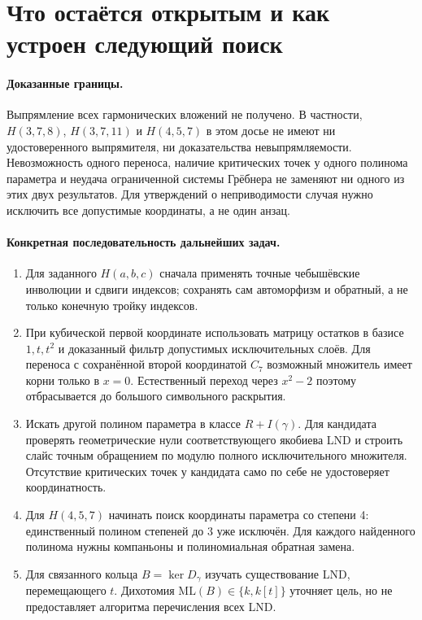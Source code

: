 \section{Что остаётся открытым и как устроен следующий поиск}

\paragraph{Доказанные границы.}
Выпрямление всех гармонических вложений не получено. В частности,
$H(3,7,8)$, $H(3,7,11)$ и $H(4,5,7)$ в этом досье не имеют
ни удостоверенного выпрямителя, ни доказательства невыпрямляемости.
Невозможность одного переноса, наличие критических точек у одного
полинома параметра и неудача ограниченной системы Грёбнера не заменяют
ни одного из этих двух результатов. Для утверждений о неприводимости
случая нужно исключить все допустимые координаты, а не один анзац.

\paragraph{Конкретная последовательность дальнейших задач.}
\begin{enumerate}
\item Для заданного $H(a,b,c)$ сначала применять точные чебышёвские
инволюции и сдвиги индексов; сохранять сам автоморфизм и обратный,
а не только конечную тройку индексов.
\item При кубической первой координате использовать матрицу остатков
в базисе $1,t,t^2$ и доказанный фильтр допустимых исключительных слоёв.
Для переноса с сохранённой второй координатой $C_7$ возможный
множитель имеет корни только в $x=0$. Естественный переход через
$x^2-2$ поэтому отбрасывается до большого символьного раскрытия.
\item Искать другой полином параметра в классе $R+I(\gamma)$.
Для кандидата проверять геометрические нули соответствующего
якобиева LND и строить слайс точным обращением по модулю полного
исключительного множителя. Отсутствие критических точек у кандидата
само по себе не удостоверяет координатность.
\item Для $H(4,5,7)$ начинать поиск координаты параметра со степени 4:
единственный полином степеней до 3 уже исключён. Для каждого найденного
полинома нужны компаньоны и полиномиальная обратная замена.
\item Для связанного кольца $B=\ker D_\gamma$ изучать существование
LND, перемещающего $t$. Дихотомия $\mathrm{ML}(B)\in\{k,k[t]\}$
уточняет цель, но не предоставляет алгоритма перечисления всех LND.
\end{enumerate}


